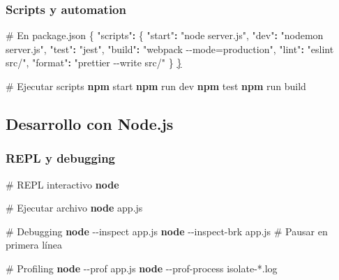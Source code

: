 \documentclass[
  11pt,
  letterpaper,
  oneside,
  openany]{scrbook}
\newenvironment{Shaded}{}{}
\newcommand{\AttributeTok}[1]{\textcolor[rgb]{0.84,0.23,0.29}{#1}}
\newcommand{\CommentTok}[1]{\textcolor[rgb]{0.42,0.45,0.49}{#1}}
\newcommand{\ErrorTok}[1]{\textcolor[rgb]{1.00,0.33,0.33}{\underline{#1}}}
\newcommand{\ExtensionTok}[1]{\textcolor[rgb]{0.84,0.23,0.29}{\textbf{#1}}}
\newcommand{\KeywordTok}[1]{\textcolor[rgb]{0.84,0.23,0.29}{#1}}
\newcommand{\NormalTok}[1]{\textcolor[rgb]{0.14,0.16,0.18}{#1}}
\newcommand{\PreprocessorTok}[1]{\textcolor[rgb]{0.84,0.23,0.29}{#1}}
\newcommand{\StringTok}[1]{\textcolor[rgb]{0.01,0.18,0.38}{#1}}
\begin{document}
\subsubsection{Scripts y automation}\label{scripts-y-automation}

\begin{Shaded}
\begin{Highlighting}[]
\CommentTok{\# En package.json}
\KeywordTok{\{}
  \StringTok{"scripts"}\ExtensionTok{:}\NormalTok{ \{}
    \StringTok{"start"}\ExtensionTok{:} \StringTok{"node server.js"}\NormalTok{,}
    \StringTok{"dev"}\ExtensionTok{:} \StringTok{"nodemon server.js"}\NormalTok{,}
    \StringTok{"test"}\ExtensionTok{:} \StringTok{"jest"}\NormalTok{,}
    \StringTok{"build"}\ExtensionTok{:} \StringTok{"webpack {-}{-}mode=production"}\NormalTok{,}
    \StringTok{"lint"}\ExtensionTok{:} \StringTok{"eslint src/"}\NormalTok{,}
    \StringTok{"format"}\ExtensionTok{:} \StringTok{"prettier {-}{-}write src/"}
  \KeywordTok{\}}
\ErrorTok{\}}

\CommentTok{\# Ejecutar scripts}
\ExtensionTok{npm}\NormalTok{ start}
\ExtensionTok{npm}\NormalTok{ run dev}
\ExtensionTok{npm}\NormalTok{ test}
\ExtensionTok{npm}\NormalTok{ run build}
\end{Highlighting}
\end{Shaded}

\subsection{Desarrollo con Node.js}\label{desarrollo-con-node.js}

\subsubsection{REPL y debugging}\label{repl-y-debugging}

\begin{Shaded}
\begin{Highlighting}[]
\CommentTok{\# REPL interactivo}
\ExtensionTok{node}

\CommentTok{\# Ejecutar archivo}
\ExtensionTok{node}\NormalTok{ app.js}

\CommentTok{\# Debugging}
\ExtensionTok{node} \AttributeTok{{-}{-}inspect}\NormalTok{ app.js}
\ExtensionTok{node} \AttributeTok{{-}{-}inspect{-}brk}\NormalTok{ app.js  }\CommentTok{\# Pausar en primera línea}

\CommentTok{\# Profiling}
\ExtensionTok{node} \AttributeTok{{-}{-}prof}\NormalTok{ app.js}
\ExtensionTok{node} \AttributeTok{{-}{-}prof{-}process}\NormalTok{ isolate{-}}\PreprocessorTok{*}\NormalTok{.log}
\end{Highlighting}
\end{Shaded}
\end{document}
